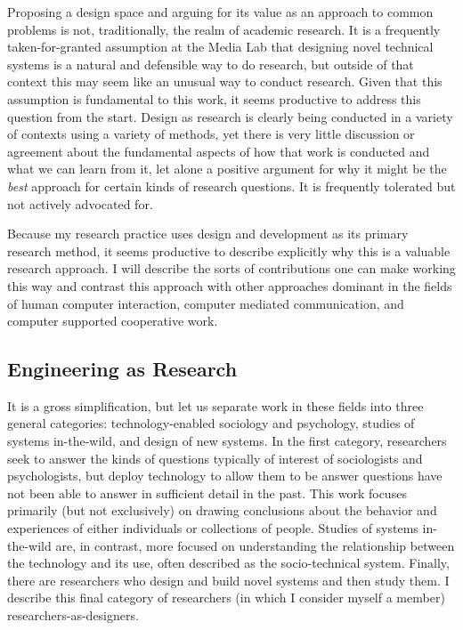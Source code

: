Proposing a design space and arguing for its value as an approach to common problems is not, traditionally, the realm of academic research. It is a frequently taken-for-granted assumption at the Media Lab that designing novel technical systems is a natural and defensible way to do research, but outside of that context this may seem like an unusual way to conduct research. Given that this assumption is fundamental to this work, it seems productive to address this question from the start. Design as research is clearly being conducted in a variety of contexts using a variety of methods, yet there is very little discussion or agreement about the fundamental aspects of how that work is conducted and what we can learn from it, let alone a positive argument for why it might be the \emph{best} approach for certain kinds of research questions. It is frequently tolerated but not actively advocated for. 



Because my research practice uses design and development as its primary research method, it seems productive to describe explicitly why this is a valuable research approach. I will describe the sorts of contributions one can make working this way and contrast this approach with other approaches dominant in the fields of human computer interaction, computer mediated communication, and computer supported cooperative work.

\subsection{Engineering as Research}

It is a gross simplification, but let us separate work in these fields into three general categories: technology-enabled sociology and psychology, studies of systems in-the-wild, and design of new systems. In the first category, researchers seek to answer the kinds of questions typically of interest of sociologists and psychologists, but deploy technology to allow them to be answer questions have not been able to answer in sufficient detail in the past. This work focuses primarily (but not exclusively) on drawing conclusions about the behavior and experiences of either individuals or collections of people. Studies of systems in-the-wild are, in contrast, more focused on understanding the relationship between the technology and its use, often described as the socio-technical system. Finally, there are researchers who design and build novel systems and then study them. I describe this final category of researchers (in which I consider myself a member) researchers-as-designers. 

